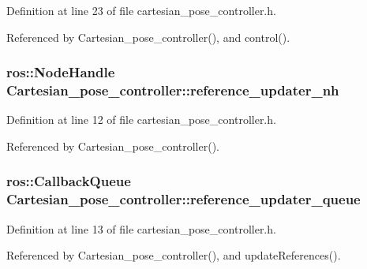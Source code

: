 Definition at line 23 of file cartesian\-\_\-pose\-\_\-controller.\-h.



Referenced by Cartesian\-\_\-pose\-\_\-controller(), and control().

\hypertarget{classCartesian__pose__controller_ab2d5fe68c8229b6c90f84ac1601eb637}{
\subsubsection[{reference\-\_\-updater\-\_\-nh}]{\setlength{\rightskip}{0pt plus 5cm}ros\-::\-Node\-Handle Cartesian\-\_\-pose\-\_\-controller\-::reference\-\_\-updater\-\_\-nh\hspace{0.3cm}{\ttfamily [private]}}}\label{classCartesian__pose__controller_ab2d5fe68c8229b6c90f84ac1601eb637}


Definition at line 12 of file cartesian\-\_\-pose\-\_\-controller.\-h.



Referenced by Cartesian\-\_\-pose\-\_\-controller().

\hypertarget{classCartesian__pose__controller_a6eea82d82ccd6c925be31c18e1b4a432}{
\subsubsection[{reference\-\_\-updater\-\_\-queue}]{\setlength{\rightskip}{0pt plus 5cm}ros\-::\-Callback\-Queue Cartesian\-\_\-pose\-\_\-controller\-::reference\-\_\-updater\-\_\-queue\hspace{0.3cm}{\ttfamily [private]}}}\label{classCartesian__pose__controller_a6eea82d82ccd6c925be31c18e1b4a432}


Definition at line 13 of file cartesian\-\_\-pose\-\_\-controller.\-h.



Referenced by Cartesian\-\_\-pose\-\_\-controller(), and update\-References().

